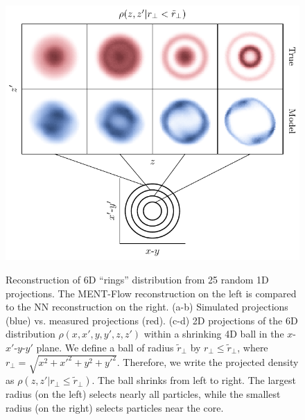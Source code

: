 \documentclass[%
    reprint,
    twocolumn,
    nofootinbib,
    amsmath,
    amssymb,
    aps,
    prstab,
]{revtex4-2}
\begin{document}
\begin{figure}
{        \includegraphics[width=\columnwidth]{fig_rec_nd_1d_nn_rings_25-proj_slice_04.pdf}%
        \label{fig:rec_6d_1d_rings_25meas-f}%
    }%
    \caption{Reconstruction of 6D ``rings'' distribution from 25 random 1D projections. The MENT-Flow reconstruction on the left is compared to the NN reconstruction on the right. (a-b) Simulated projections (blue) vs. measured projections (red). (c-d) 2D projections of the 6D distribution $\rho(x, x', y, y', z, z')$ within a shrinking 4D ball in the $x$-$x'$-$y$-$y'$ plane. We define a ball of radius $\tilde{r}_\perp$ by ${r}_\perp \le \tilde{r}_\perp$, where ${r}_\perp = \sqrt{x^2 + x'^2 + y^2 + y'^2}$. Therefore, we write the projected density as $\rho(z, z' | r_\perp \le \tilde{r}_\perp)$. The ball shrinks from left to right. The largest radius (on the left) selects nearly all particles, while the smallest radius (on the right) selects particles near the core.}
    \label{fig:rec_6d_1d_rings_25meas}
\end{figure}
%
\end{document}
